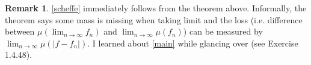 \documentclass[12pt]{article}
\theoremstyle{plain}
\theoremstyle{definition}
\newtheorem*{remark}{Remark}
\begin{document}
\begin{remark}
    \cref{scheffe} immediately follows from the theorem above.
    Informally, the theorem says some mass is missing when taking limit 
    and the loss (i.e. difference between $\mu(\lim_{n \to \infty}f_n)$ 
    and $\lim_{n \to \infty} \mu(f_n)$) can be measured by $\lim_{n \to \infty} \mu(|f - f_n|)$.
    I learned about \cref{main} while glancing over \cite{tao2011introduction}(see Exercise 1.4.48).
\end{remark}



\end{document}
